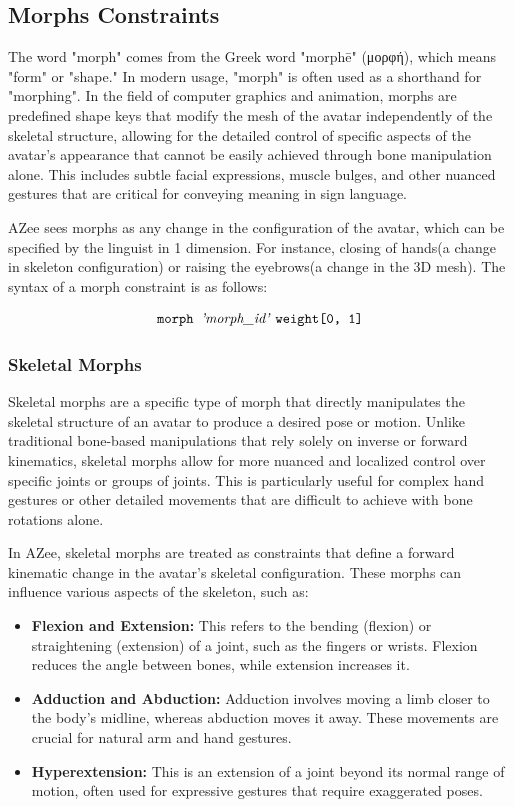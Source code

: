 \documentclass[../../main.tex]{subfiles}
\begin{document}
\subsection{Morphs Constraints}
\label{ch:rigging_layers:proc_rig_signing_avatars:morph_constraints}

The word "morph" comes from the Greek word "morphē" (μορφή), which means "form" or "shape." In modern usage, "morph" is often used as a shorthand for "morphing". In the field of computer graphics and animation, morphs are predefined shape keys that modify the mesh of the avatar independently of the skeletal structure, allowing for the detailed control of specific aspects of the avatar's appearance that cannot be easily achieved through bone manipulation alone. This includes subtle facial expressions, muscle bulges, and other nuanced gestures that are critical for conveying meaning in sign language.

AZee sees morphs as any change in the configuration of the avatar, which can be specified by the linguist in 1 dimension. For instance, closing of hands(a change in skeleton configuration) or raising the eyebrows(a change in the 3D mesh). The syntax of a morph constraint is as follows:

\[
\texttt{morph } \text{\emph{'morph\_id'}} \ \texttt{weight[0, 1]}
\]

\subsubsection{Skeletal Morphs}
\label{ch:rigging_layers:proc_rig_signing_avatars:morph_constraints:skel_morphs}

Skeletal morphs are a specific type of morph that directly manipulates the skeletal structure of an avatar to produce a desired pose or motion. Unlike traditional bone-based manipulations that rely solely on inverse or forward kinematics, skeletal morphs allow for more nuanced and localized control over specific joints or groups of joints. This is particularly useful for complex hand gestures or other detailed movements that are difficult to achieve with bone rotations alone.

In AZee, skeletal morphs are treated as constraints that define a forward kinematic change in the avatar's skeletal configuration. These morphs can influence various aspects of the skeleton, such as:

\begin{itemize}
    \item \textbf{Flexion and Extension:} This refers to the bending (flexion) or straightening (extension) of a joint, such as the fingers or wrists. Flexion reduces the angle between bones, while extension increases it.
    \item \textbf{Adduction and Abduction:} Adduction involves moving a limb closer to the body's midline, whereas abduction moves it away. These movements are crucial for natural arm and hand gestures.
    \item \textbf{Hyperextension:} This is an extension of a joint beyond its normal range of motion, often used for expressive gestures that require exaggerated poses.
\end{itemize}
\end{document}
